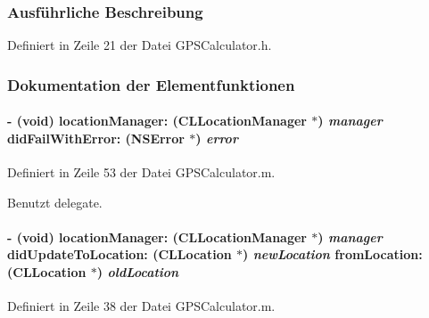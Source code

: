\subsubsection{Ausführliche Beschreibung}


Definiert in Zeile 21 der Datei GPSCalculator.h.

\subsubsection{Dokumentation der Elementfunktionen}
\hypertarget{interface_g_p_s_calculator_a172bfe3f489df71bd558a074770caf71}{
\paragraph[{locationManager:didFailWithError:}]{\setlength{\rightskip}{0pt plus 5cm}-\/ (void) locationManager: (CLLocationManager $\ast$) {\em manager}\/ didFailWithError: (NSError $\ast$) {\em error}}\hfill}
\label{interface_g_p_s_calculator_a172bfe3f489df71bd558a074770caf71}


Definiert in Zeile 53 der Datei GPSCalculator.m.

Benutzt delegate.\hypertarget{interface_g_p_s_calculator_ace4b565a8dca496da97ca7e890226136}{
\paragraph[{locationManager:didUpdateToLocation:fromLocation:}]{\setlength{\rightskip}{0pt plus 5cm}-\/ (void) locationManager: (CLLocationManager $\ast$) {\em manager}\/ didUpdateToLocation: (CLLocation $\ast$) {\em newLocation}\/ fromLocation: (CLLocation $\ast$) {\em oldLocation}}\hfill}
\label{interface_g_p_s_calculator_ace4b565a8dca496da97ca7e890226136}


Definiert in Zeile 38 der Datei GPSCalculator.m.

